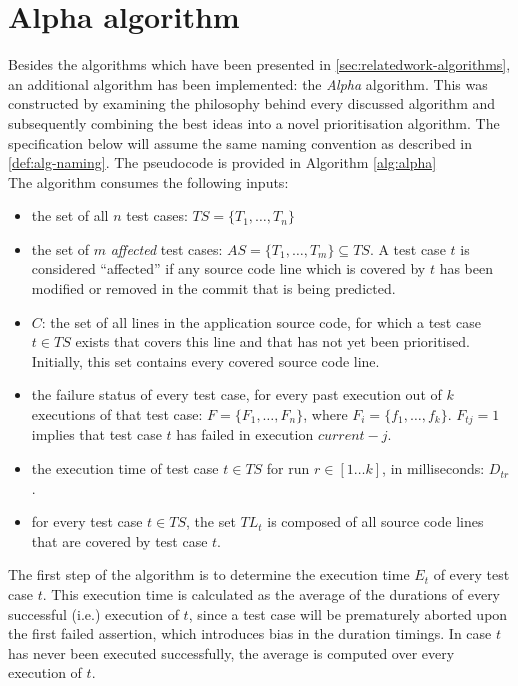
\section{Alpha algorithm}
Besides the algorithms which have been presented in \autoref{sec:relatedwork-algorithms}, an additional algorithm has been implemented: the \emph{Alpha} algorithm. This was constructed by examining the philosophy behind every discussed algorithm and subsequently combining the best ideas into a novel prioritisation algorithm. The specification below will assume the same naming convention as described in \autoref{def:alg-naming}. The pseudocode is provided in Algorithm \ref{alg:alpha}\\

\noindent The algorithm consumes the following inputs:
\begin{itemize}
	\item the set of all $n$ test cases: $TS = \{T_1, \dots, T_n\}$
	
	\item the set of $m$ \emph{affected} test cases: $AS = \{T_1, \dots, T_m\} \subseteq TS$. A test case $t$ is considered ``affected'' if any source code line which is covered by $t$ has been modified or removed in the commit that is being predicted.
	
	\item $C$: the set of all lines in the application source code, for which a test case $t \in TS$ exists that covers this line and that has not yet been prioritised. Initially, this set contains every covered source code line.
	
	\item the failure status of every test case, for every past execution out of $k$ executions of that test case: $F = \{F_1, \dots, F_n\}$, where $F_i = \{f_1, \dots, f_k\}$. $F_{tj} = 1$ implies that test case $t$ has failed in execution $current - j$.
	
	\item the execution time of test case $t \in TS$ for run $r \in [1 \dots k]$, in milliseconds: $D_{tr}$.
	
	\item for every test case $t \in TS$, the set $TL_t$ is composed of all source code lines that are covered by test case $t$.
\end{itemize}

\noindent The first step of the algorithm is to determine the execution time $E_t$ of every test case $t$. This execution time is calculated as the average of the durations of every successful (i.e.) execution of $t$, since a test case will be prematurely aborted upon the first failed assertion, which introduces bias in the duration timings. In case $t$ has never been executed successfully, the average is computed over every execution of $t$.


